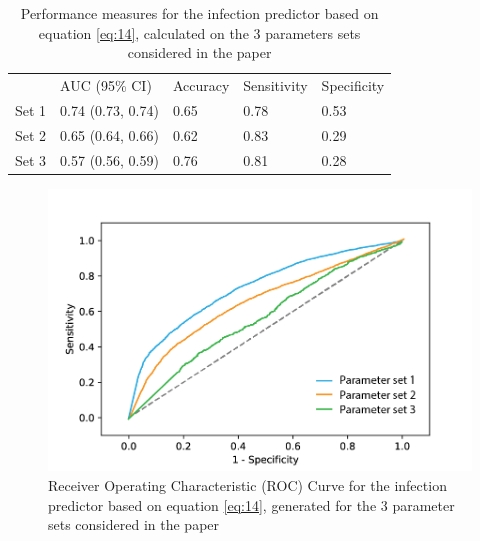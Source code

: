 \documentclass{article}
\begin{document}
\begin{table}
\caption{Performance measures for the infection predictor based on equation \eqref{eq:14}, calculated on the 3 parameters sets considered in the paper}
\centering
\begin{tabular}{lllll}
\rowcolor[rgb]{0.878,0.878,0.878}         & AUC (95\% CI)     & Accuracy & Sensitivity & Specificity  \\
{\cellcolor[rgb]{0.878,0.878,0.878}}Set 1 & 0.74 (0.73, 0.74) & 0.65     & 0.78        & 0.53         \\
{\cellcolor[rgb]{0.878,0.878,0.878}}Set 2 & 0.65 (0.64, 0.66) & 0.62     & 0.83        & 0.29         \\
{\cellcolor[rgb]{0.878,0.878,0.878}}Set 3 & 0.57 (0.56, 0.59) & 0.76     & 0.81        & 0.28   
\end{tabular}
\label{tab:table4}
\end{table}


\begin{figure} %
  \centering
  \includegraphics[scale=0.8]{Figure-4.png}
  \caption{Receiver Operating Characteristic (ROC) Curve for the infection predictor based on equation \eqref{eq:14}, generated for the 3 parameter sets considered in the paper}
  \label{fig:fig4}
\end{figure}
\end{document}
